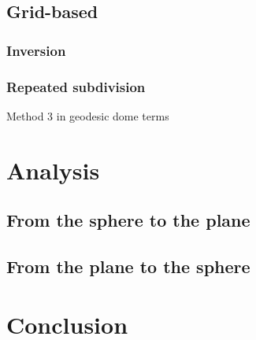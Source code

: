 \documentclass{amsart}[12pt]
\begin{document}
\subsection{Grid-based}

\subsubsection{Inversion}

\subsubsection{Repeated subdivision}
Method 3 in geodesic dome terms

\section{Analysis}
\subsection{From the sphere to the plane}

\subsection{From the plane to the sphere}

\section{Conclusion}



\end{document}
